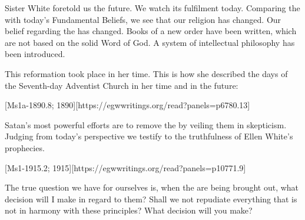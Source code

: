 Sister White foretold us the future. We watch its fulfilment today. Comparing the  with today’s Fundamental Beliefs, we see that our religion has changed. Our belief regarding the  has changed. Books of a new order have been written, which are not based on the solid Word of God. A system of intellectual philosophy has been introduced.

This reformation took place in her time. This is how she described the days of the Seventh-day Adventist Church in her time and in the future:

[Ms1a-1890.8; 1890][https://egwwritings.org/read?panels=p6780.13]

Satan's most powerful efforts are to remove the  by veiling them in skepticism. Judging from today’s perspective we testify to the truthfulness of Ellen White’s prophecies.

[Ms1-1915.2; 1915][https://egwwritings.org/read?panels=p10771.9]

The true question we have for ourselves is, when the  are being brought out, what decision will I make in regard to them? Shall we not repudiate everything that is not in harmony with these principles? What decision will you make?

